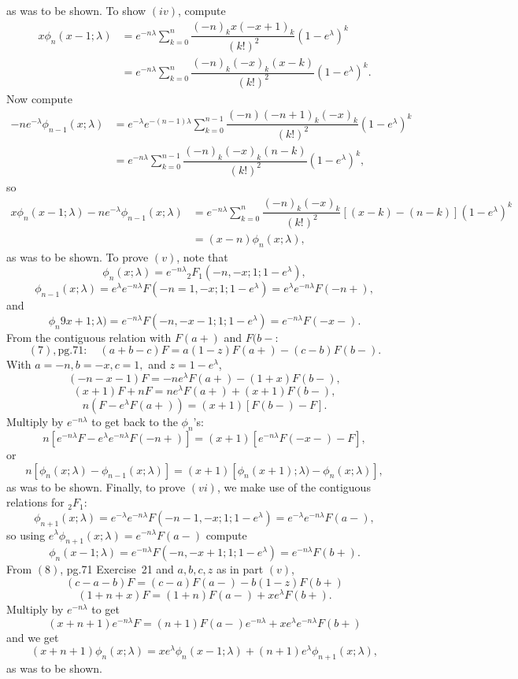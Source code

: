 \begin{solution}
as was to be shown. To show $(iv)$, compute
$$\begin{array}{ll}
x \phi_n(x-1;\lambda) &= e^{-n\lambda} \displaystyle\sum_{k=0}^n \dfrac{(-n)_k x (-x+1)_k}{(k!)^2} (1-e^{\lambda})^k \\
&= e^{-n\lambda} \displaystyle\sum_{k=0}^n \dfrac{(-n)_k (-x)_k (x-k)}{(k!)^2} (1-e^{\lambda})^k.
\end{array}$$
Now compute
$$\begin{array}{ll}
-n e^{-\lambda} \phi_{n-1}(x;\lambda) &= e^{-\lambda} e^{-(n-1)\lambda} \displaystyle\sum_{k=0}^{n-1} \dfrac{(-n)(-n+1)_k(-x)_k}{(k!)^2} (1-e^{\lambda})^k \\
&= e^{-n\lambda} \displaystyle\sum_{k=0}^{n-1} \dfrac{(-n)_k (-x)_k (n-k)}{(k!)^2} (1-e^{\lambda})^k,
\end{array}$$
so
$$\begin{array}{ll}
x\phi_n(x-1;\lambda) -ne^{-\lambda}\phi_{n-1}(x;\lambda) &= e^{-n\lambda} \displaystyle\sum_{k=0}^n \dfrac{(-n)_k (-x)_k}{(k!)^2} [(x-k)-(n-k)] (1-e^{\lambda})^k \\
&= (x-n) \phi_n(x;\lambda),
\end{array}$$
as was to be shown. To prove $(v)$, note that
$$\phi_n(x;\lambda)=e^{-n\lambda} {}_2F_1(-n,-x;1;1-e^{\lambda}),$$
$$\phi_{n-1}(x;\lambda) = e^{\lambda} e^{-n\lambda} F(-n=1,-x;1;1-e^{\lambda}) = e^{\lambda}e^{-n\lambda} F(-n+),$$
and
$$\phi_n9x+1;\lambda) = e^{-n\lambda} F(-n,-x-1;1;1-e^{\lambda}) = e^{-n\lambda} F(-x-).$$
From the contiguous relation with $F(a+)$ and $F(b-$:
$$(7),\mathrm{pg.}71: \quad (a+b-c)F=a(1-z)F(a+)-(c-b)F(b-).$$
With $a=-n, b=-x,c=1,$ and $z=1-e^{\lambda}$,
$$(-n-x-1)F = -ne^{\lambda}F(a+) - (1+x)F(b-),$$
$$(x+1)F+nF = ne^{\lambda} F(a+) + (x+1)F(b-),$$
$$n(F-e^{\lambda}F(a+)) = (x+1)[F(b-)-F].$$
Multiply by $e^{-n\lambda}$ to get back to the $\phi_n$'s:
$$n[e^{-n\lambda}F-e^{\lambda}e^{-n\lambda} F(-n+)] = (x+1) [e^{-n\lambda} F(-x-)-F],$$
or
$$n[\phi_n(x;\lambda)-\phi_{n-1}(x;\lambda)]=(x+1)[\phi_n(x+1);\lambda)-\phi_n(x;\lambda)],$$
as was to be shown. Finally, to prove $(vi)$, we make use of the contiguous relations for ${}_2F_1$:
$$\phi_{n+1}(x;\lambda) = e^{-\lambda}e^{-n\lambda} F(-n-1,-x;1;1-e^{\lambda})=e^{-\lambda}e^{-n\lambda}F(a-),$$
so using $e^{\lambda}\phi_{n+1}(x;\lambda)=e^{-n\lambda}F(a-)$ compute
$$\phi_n(x-1;\lambda) = e^{-n\lambda} F(-n,-x+1;1;1-e^{\lambda})=e^{-n\lambda} F(b+).$$
From $(8)$, pg.71 Exercise~21 and $a,b,c,z$ as in part $(v)$,
$$(c-a-b)F=(c-a)F(a-)-b(1-z)F(b+)$$
$$(1+n+x)F = (1+n)F(a-)+xe^{\lambda}F(b+).$$
Multiply by $e^{-n\lambda}$ to get
$$(x+n+1)e^{-n\lambda}F = (n+1)F(a-)e^{-n\lambda} + xe^{\lambda} e^{-n\lambda} F(b+)$$
and we get
$$(x+n+1)\phi_n(x;\lambda)=xe^{\lambda}\phi_n(x-1;\lambda)+(n+1)e^{\lambda} \phi_{n+1}(x;\lambda),$$
as was to be shown.
\end{solution}
